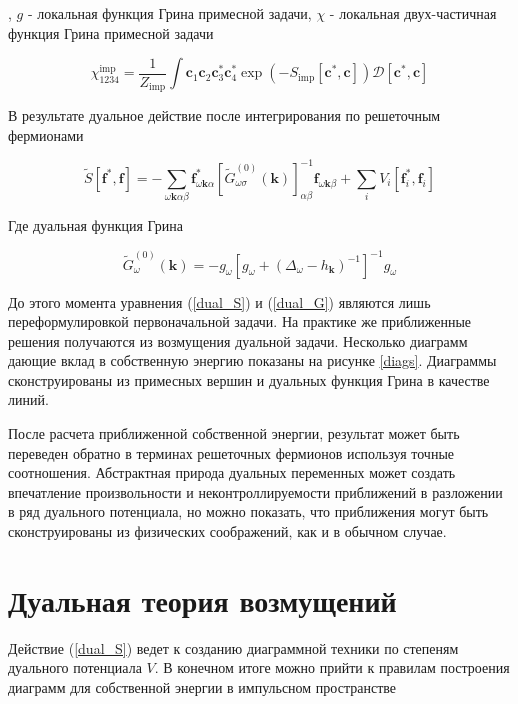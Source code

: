 \documentclass[11pt,a4paper]{report}
\begin{document}
, $g$ - локальная функция Грина примесной задачи, $\chi$ - локальная двух-частичная функция Грина примесной задачи

\begin{equation}
 \chi_{1234}^{\text{imp}} = \frac{1}{Z_{\text{imp}}} \int \mathbf{c}_1 \mathbf{c}_2 \mathbf{c}^*_3 \mathbf{c}^*_4 \exp{(-S_{\text{imp}}[\mathbf{c}^*,\mathbf{c}])}\mathcal{D}[\mathbf{c}^*,\mathbf{c}]
\end{equation}

В результате дуальное действие после интегрирования по решеточным фермионами

\begin{equation}
 \label{dual_S}
 \tilde{S}[\mathbf{f}^*,\mathbf{f}] = -\sum_{\omega\mathbf{k}\alpha\beta}\mathbf{f}^*_{\omega\mathbf{k}\alpha}[\tilde{G}^{(0)}_{\omega\sigma}(\mathbf{k})]_{\alpha\beta}^{-1}\mathbf{f}_{\omega\mathbf{k}\beta}+\sum_i V_i[\mathbf{f}^*_i,\mathbf{f}_i]
\end{equation}

Где дуальная функция Грина

\begin{equation}
 \label{dual_G}
 \tilde{G}^{(0)}_\omega(\mathbf{k}) = -g_\omega\left[g_\omega+(\Delta_\omega-h_\mathbf{k})^{-1}\right]^{-1} g_\omega
\end{equation}

До этого момента уравнения (\ref{dual_S}) и (\ref{dual_G}) являются лишь переформулировкой первоначальной задачи. На практике же приближенные решения получаются из возмущения дуальной задачи.
Несколько диаграмм дающие вклад в собственную энергию показаны на рисунке \ref{diags}. Диаграммы сконструированы из примесных вершин и дуальных функция Грина в качестве линий.

После расчета приближенной собственной энергии, результат может быть переведен обратно в терминах решеточных фермионов используя точные соотношения. 
Абстрактная природа дуальных переменных может создать впечатление произвольности и неконтроллируемости приближений в разложении в ряд дуального потенциала, 
 но можно показать, что приближения могут быть сконструированы из физических соображений, как и в обычном случае.

\section{Дуальная теория возмущений}

Действие (\ref{dual_S}) ведет к созданию диаграммной техники по степеням дуального потенциала $V$. В конечном итоге можно прийти к правилам построения диаграмм для собственной энергии в импульсном пространстве
 
\end{document}
